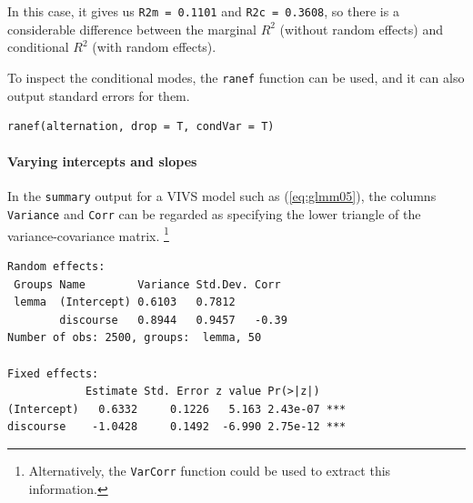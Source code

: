 \documentclass[a4paper,12pt]{article}
\begin{document}
In this case, it gives us \texttt{R2m = 0.1101} and \texttt{R2c = 0.3608}, so there is a considerable difference between the marginal $R^2$ (without random effects) and conditional $R^2$ (with random effects).

To inspect the conditional modes, the \texttt{ranef} function can be used, and it can also output standard errors for them.

\vspace{0.5\baselineskip}

\begin{lstlisting}
ranef(alternation, drop = T, condVar = T)
\end{lstlisting}

% 
% 
% 

\paragraph{Varying intercepts and slopes}

In the \texttt{summary} output for a VIVS model such as (\ref{eq:glmm05}), the columns \texttt{Variance} and \texttt{Corr} can be regarded as specifying the lower triangle of the variance-covariance matrix.%
\footnote{Alternatively, the \texttt{VarCorr} function could be used to extract this information.}

\vspace{0.5\baselineskip}

\begin{lstlisting}
Random effects:
 Groups Name        Variance Std.Dev. Corr 
 lemma  (Intercept) 0.6103   0.7812        
        discourse   0.8944   0.9457   -0.39
Number of obs: 2500, groups:  lemma, 50

Fixed effects:
            Estimate Std. Error z value Pr(>|z|)    
(Intercept)   0.6332     0.1226   5.163 2.43e-07 ***
discourse    -1.0428     0.1492  -6.990 2.75e-12 ***
\end{lstlisting}
\end{document}

